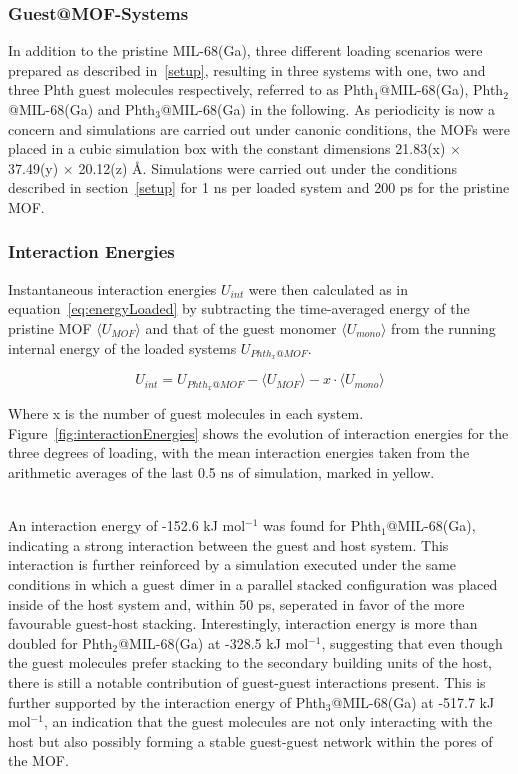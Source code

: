 \documentclass[11pt]{article}
\begin{document}
\subsubsection{Guest@MOF-Systems}
In addition to the pristine MIL-68(Ga), three different loading scenarios were prepared as described in~\ref{setup}, resulting in three systems with one, two and three Phth guest molecules respectively, referred to as Phth$_1$@MIL-68(Ga), Phth$_2$@MIL-68(Ga) and Phth$_3$@MIL-68(Ga) in the following. As periodicity is now a concern and simulations are carried out under canonic conditions, the MOFs were placed in a cubic simulation box with the constant dimensions 21.83(x) $\times$ 37.49(y) $\times$ 20.12(z) Å. Simulations were carried out under the conditions described in section~\ref{setup} for 1 ns per loaded system and 200 ps for the pristine MOF.
\subsubsection*{Interaction Energies}
Instantaneous interaction energies $U_{int}$ were then calculated as in equation~\ref{eq:energyLoaded} by subtracting the time-averaged energy of the pristine MOF $\langle U_{MOF}\rangle$ and that of the guest monomer $\langle U_{mono}\rangle$ from the running internal energy of the loaded systems $U_{Phth_x@MOF}$.

\begin{equation}
  U_{int} = U_{Phth_x@MOF} - \langle U_{MOF}\rangle -  x \cdot \langle U_{mono}\rangle
  \label{eq:energyLoaded}
\end{equation}

\bigskip

\noindent Where x is the number of guest molecules in each system. Figure~\ref{fig:interactionEnergies} shows the evolution of interaction energies for the three degrees of loading, with the mean interaction energies taken from the arithmetic averages of the last 0.5 ns of simulation, marked in yellow. 
\par \noindent \\ An interaction energy of -152.6 kJ mol$^{-1}$ was found for Phth$_1$@MIL-68(Ga), indicating a strong interaction between the guest and host system. This interaction is further reinforced by a simulation executed under the same conditions in which a guest dimer in a parallel stacked configuration was placed inside of the host system and, within 50 ps, seperated in favor of the more favourable guest-host stacking. Interestingly, interaction energy is more than doubled for Phth$_2$@MIL-68(Ga) at -328.5 kJ mol$^{-1}$, suggesting that even though the guest molecules prefer stacking to the secondary building units of the host, there is still a notable contribution of guest-guest interactions present. This is further supported by the interaction energy of Phth$_3$@MIL-68(Ga) at -517.7 kJ mol$^{-1}$, an indication that the guest molecules are not only interacting with the host but also  possibly forming a stable guest-guest network within the pores of the MOF.
\end{document}
